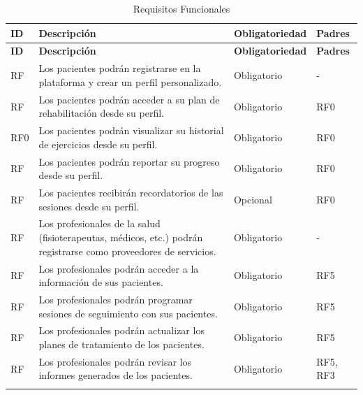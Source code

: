 \documentclass{article}
\begin{document}
\begin{longtable}{@{} p{2.5cm} p{6.5cm} p{3cm} p{3cm} @{}}
	\caption{Requisitos Funcionales}\\
	\toprule
	\textbf{ID} & \textbf{Descripción} & \textbf{Obligatoriedad} & \textbf{Padres} \\
	\midrule
	\endfirsthead
	
	\toprule
	\textbf{ID} & \textbf{Descripción} & \textbf{Obligatoriedad} & \textbf{Padres} \\
	\midrule
	\endhead
	
	\addlinespace
	RF\therequisitosFuncionales & Los pacientes podrán registrarse en la plataforma y crear un perfil personalizado. & Obligatorio & - \\ 
	\addlinespace \stepcounter{requisitosFuncionales}
	RF\therequisitosFuncionales & Los pacientes podrán acceder a su plan de rehabilitación desde su perfil. & Obligatorio & RF0\\ 
	\addlinespace \stepcounter{requisitosFuncionales}
	RF0 & Los pacientes podrán visualizar su historial de ejercicios desde su perfil. & Obligatorio & RF0 \\ 
	\addlinespace \stepcounter{requisitosFuncionales}
	RF\therequisitosFuncionales & Los pacientes podrán reportar su progreso desde su perfil. & Obligatorio & RF0 \\ 
	\addlinespace \stepcounter{requisitosFuncionales}
	RF\therequisitosFuncionales & Los pacientes recibirán recordatorios de las sesiones desde su perfil. & Opcional & RF0 \\ 
	\addlinespace \stepcounter{requisitosFuncionales}
	RF\therequisitosFuncionales & Los profesionales de la salud (fisioterapeutas, médicos, etc.) podrán registrarse como proveedores de servicios. & Obligatorio & - \\ 
	\addlinespace \stepcounter{requisitosFuncionales}
	RF\therequisitosFuncionales & Los profesionales podrán acceder a la información de sus pacientes. & Obligatorio & RF5 \\ 
	\addlinespace \stepcounter{requisitosFuncionales}
	RF\therequisitosFuncionales & Los profesionales podrán programar sesiones de seguimiento con sus pacientes. & Obligatorio & RF5 \\ 
	\addlinespace \stepcounter{requisitosFuncionales}
	RF\therequisitosFuncionales & Los profesionales podrán actualizar los planes de tratamiento de los pacientes. & Obligatorio & RF5 \\ 
	\addlinespace \stepcounter{requisitosFuncionales}
	RF\therequisitosFuncionales & Los profesionales podrán revisar los informes generados de los pacientes. & Obligatorio & RF5, RF3\\ 
	\addlinespace \stepcounter{requisitosFuncionales}
	 


\end{longtable}
\end{document}
